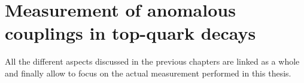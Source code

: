 \chapter{Measurement of anomalous couplings in top-quark decays} \label{ch::Analysis}

All the different aspects discussed in the previous chapters are linked as a whole and finally allow to focus on the actual measurement performed in this thesis.
